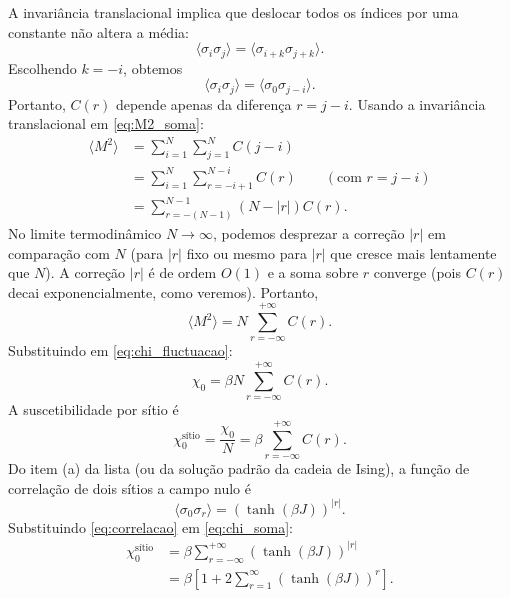 \documentclass[11pt,a4paper]{article}
\begin{document}
%
A invariância translacional implica que deslocar todos os índices por uma constante não altera a média:
%
\begin{equation}
    \langle \sigma_i \sigma_j \rangle = \langle \sigma_{i+k} \sigma_{j+k} \rangle.
\end{equation}
%
Escolhendo $k = -i$, obtemos
\begin{equation}
    \langle \sigma_i \sigma_j \rangle = \langle \sigma_0 \sigma_{j-i} \rangle.
\end{equation}
%
Portanto, $C(r)$ depende apenas da diferença $r = j-i$.
Usando a invariância translacional em \eqref{eq:M2_soma}:
%
\begin{align}
    \langle M^2 \rangle &= \sum_{i=1}^N \sum_{j=1}^N C(j-i) \\
    &= \sum_{i=1}^N \sum_{r = -i+1}^{N-i} C(r) \qquad (\text{com } r = j-i) \\
    &= \sum_{r = -(N-1)}^{N-1} (N - |r|) C(r).
\end{align}
%
No limite termodinâmico $N \to \infty$, podemos desprezar a correção $|r|$ em comparação com $N$ (para $|r|$ fixo ou mesmo para $|r|$ que cresce mais lentamente que $N$). A correção $|r|$ é de ordem $O(1)$ e a soma sobre $r$ converge (pois $C(r)$ decai exponencialmente, como veremos). Portanto,
%
\begin{equation}
    \langle M^2 \rangle = N \sum_{r = -\infty}^{+\infty} C(r).
\end{equation}
%
Substituindo em \eqref{eq:chi_fluctuacao}:
%
\begin{equation}
    \chi_0 = \beta N \sum_{r = -\infty}^{+\infty} C(r).
\end{equation}
%
A suscetibilidade por sítio é
%
\begin{equation}
    \chi_0^{\text{sítio}} = \frac{\chi_0}{N} = \beta \sum_{r = -\infty}^{+\infty} C(r).
    \label{eq:chi_soma}
\end{equation}
%
Do item (a) da lista (ou da solução padrão da cadeia de Ising), a função de correlação de dois sítios a campo nulo é
%
\begin{equation}
    \langle \sigma_0 \sigma_r \rangle = \left( \tanh(\beta J) \right)^{|r|}.
    \label{eq:correlacao}
\end{equation}
%
Substituindo \eqref{eq:correlacao} em \eqref{eq:chi_soma}:
%
\begin{align}
    \chi_0^{\text{sítio}}
    &= \beta \sum_{r=-\infty}^{+\infty} \left( \tanh(\beta J) \right)^{|r|} \\
    &= \beta \left[ 1 + 2 \sum_{r=1}^{\infty} \left( \tanh(\beta J) \right)^r \right].
    \label{eq:chi_serie}
\end{align}
\end{document}
